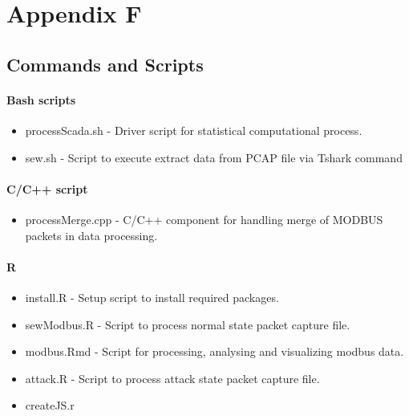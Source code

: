 \documentclass[11pt,a4paper]{article}
\begin{document}
\newpage

\section*{Appendix F}\label{appendix-f}

\subsection*{Commands and Scripts}\label{commands-and-scripts}

\paragraph*{Bash scripts}\label{bash-scripts}

\begin{itemize}
\itemsep1pt\parskip0pt
\item
  processScada.sh - Driver script for statistical computational process.
\item
  sew.sh - Script to execute extract data from PCAP file via Tshark
  command
\end{itemize}

\paragraph*{C/C++ script}\label{cc-script}

\begin{itemize}
\itemsep1pt\parskip0pt
\item
  processMerge.cpp - C/C++ component for handling merge of MODBUS
  packets in data processing.
\end{itemize}

\paragraph*{R}\label{r}

\begin{itemize}
\itemsep1pt\parskip0pt
\item
  install.R - Setup script to install required packages.
\item
  sewModbus.R - Script to process normal state packet capture file.
\item
  modbus.Rmd - Script for processing, analysing and visualizing modbus
  data.
\item
  attack.R - Script to process attack state packet capture file.
\item
  createJS.r
\end{itemize}
\end{document}
